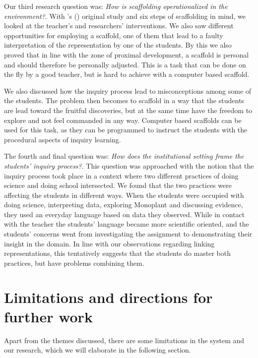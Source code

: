 
Our third research question was: \emph{How is scaffolding operationalized in the environment?}.
With \citeauthor{wood1976role}'s (\citeyear{wood1976role}) original study and six steps of scaffolding in mind, we looked at the teacher's and researchers' interventions.  We also saw different opportunities for employing a scaffold, one of them that lead to a faulty interpretation of the representation by one of the students. By this we also proved that in line with the zone of proximal development, a scaffold is personal and should therefore be personally adjusted. This is a task that can be done on the fly by a good teacher, but is hard to achieve with a computer based scaffold. 

We also discussed how the inquiry process lead to misconceptions among some of the students. The problem then becomes to scaffold in a way that the students are lead toward the fruitful discoveries, but at the same time have the freedom to explore and not feel commanded in any way. Computer based scaffolds can be used for this task, as they can be programmed to instruct the students with the procedural aspects of inquiry learning. 

The fourth and final question was: \emph{How does the institutional setting frame the students' inquiry process?}. This question was approached with the notion that the inquiry process took place in a context where two different practices of doing science and doing school intersected. We found that the two practices were affecting the students in different ways. When the students were occupied with doing science, interpreting data, exploring Monoplant and discussing evidence, they used an everyday language based on data they observed. While in contact with the teacher the students' language became more scientific oriented, and the students' concerns went from investigating the assignment to demonstrating their insight in the domain. In line with our observations regarding linking representations, this tentatively suggests that the students do master both practices, but have problems combining them.

\section{Limitations and directions for further work}
Apart from the themes discussed, there are some limitations in the system and our research, which we will elaborate in the following section. 

